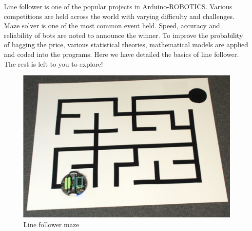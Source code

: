 \par Line follower is one of the popular projects in Arduino-ROBOTICS. Various competitions are held across the world with varying difficulty and challenges. Maze solver is one of the most common event held. Speed, accuracy and reliability of bots are noted to announce the winner. To improve the probability of bagging the price, various statistical theories, mathematical models are applied and coded into the programs. Here we have detailed the basics of line follower. The rest is left to you to explore!

\begin{figure}
    \centering
    \includegraphics{Images/IR Sensor/line_maze.png}
    \caption{Line follower maze}
\end{figure}
